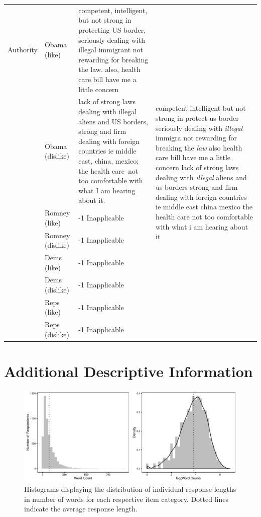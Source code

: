 \documentclass[12pt]{article}
\begin{document}
\begin{center}
\begin{longtable}{lp{1.5cm}p{5.5cm}p{5.5cm}}
	 Authority & Obama (like) & competent, intelligent, but not strong in protecting US border, seriously dealing with illegal immigrant not rewarding for breaking the law. also, health care bill have me a little concern & \multirow{8}{5.5cm}{competent intelligent but not strong in protect us border seriously dealing with \textit{illegal} immigra not rewarding for breaking the \textit{law} also health care bill have me a little concern lack of strong laws dealing with \textit{illegal} aliens and us borders strong and firm dealing with foreign countries ie middle east china mexico the health care not too comfortable with what i am hearing about it} \\
	 	 & Obama (dislike) & lack of strong laws dealing with illegal aliens and US borders, strong and firm dealing with foreign countries ie middle east, china, mexico; the health care--not too comfortable with what I am hearing about it. \\
	 	 & Romney (like) & -1 Inapplicable \\
	 	 & Romney (dislike) & -1 Inapplicable \\
	 	 & Dems (like) & -1 Inapplicable \\
	 	 & Dems (dislike) & -1 Inapplicable \\
	 	 & Reps (like) & -1 Inapplicable \\
	 	 & Reps (dislike) & -1 Inapplicable \\ \hline
\end{longtable}

\end{center}


\clearpage
\section{Additional Descriptive Information}\label{app:oview}
\renewcommand\thefigure{\thesection.\arabic{figure}}
\renewcommand\thetable{\thesection.\arabic{table}}
\setcounter{figure}{0}
\setcounter{table}{0}



\begin{figure}[h]\centering
\includegraphics[width=\textwidth]{../calc/fig/app_wc.pdf}
\caption{Histograms displaying the distribution of individual response lengths in number of words for each respective item category. Dotted lines indicate the average response length.}\label{fig:appB2num}
\end{figure}
\end{document}
